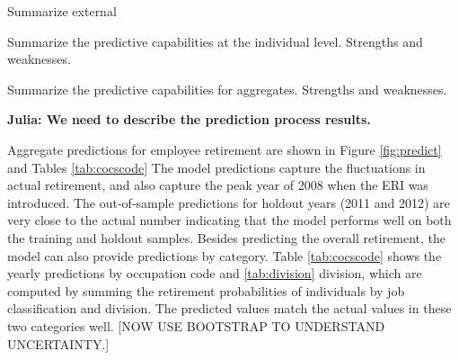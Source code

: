 \documentclass[12pt,letterpaper]{article}
\begin{document}
%			
%			

Summarize external

Summarize the predictive capabilities at the individual level.  Strengths and weaknesses.

Summarize the predictive capabilities for aggregates.  Strengths and weaknesses.

{\bf Julia: We need to describe the prediction process results.}

 Aggregate predictions for employee retirement are shown in Figure \ref{fig:predict} and Tables \ref{tab:cocscode} %
 The model predictions capture the fluctuations in actual retirement, and also capture the peak year of 2008 when the ERI was introduced. The out-of-sample predictions for holdout years (2011 and 2012) are very close to the actual number indicating that the model performs well on both the training and holdout samples. Besides predicting the overall retirement, the model can also provide predictions by category. Table \ref{tab:cocscode} shows the yearly predictions by occupation code and \ref{tab:division} division, which are computed by summing the retirement probabilities of individuals by job classification and division.  The predicted values match the actual values in these two categories well.  [NOW USE BOOTSTRAP TO UNDERSTAND UNCERTAINTY.]
\end{document}
